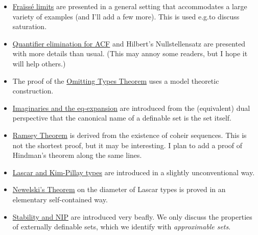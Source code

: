 \documentclass[creche.tex]{subfiles}
\begin{document}
\begin{itemize}
\item \hyperref[rich]{Fraïssé limits} are presented in a general setting that accommodates a large variety of examples (and I'll add a few more). This is used e.g.\@ to discuss saturation.
\item \hyperref[algebraic]{Quantifier elimination for ACF} and Hilbert's Nullstellensatz are presented with more details than usual. (This may annoy some readers, but I hope it will help others.)
\item The proof of the \hyperref[countable]{Omitting Types Theorem} uses a model theoretic construction.
\item \hyperref[imaginary]{Imaginaries and the eq-expansion} are introduced from the (equivalent) dual perspective that the canonical name of a definable set is the set itself.
\item \hyperref[Ramsey]{Ramsey Theorem} is derived from the existence of coheir sequences. This is not the shortest proof, but it may be interesting. I plan to add a proof of Hindman's theorem along the same lines.
\item \hyperref[invariantL]{Lascar and Kim-Pillay types} are introduced in a slightly unconventional way. %
\item \hyperref[newelski]{Newelski's Theorem\/} on the diameter of Lascar types is proved in an elementary self-contained way.
\item  \hyperref[external]{Stability and NIP\/} are introduced very beafly. We only discuss the properties of externally definable sets, which we identify with \textit{approximable sets}.
\end{itemize}
\end{document}
